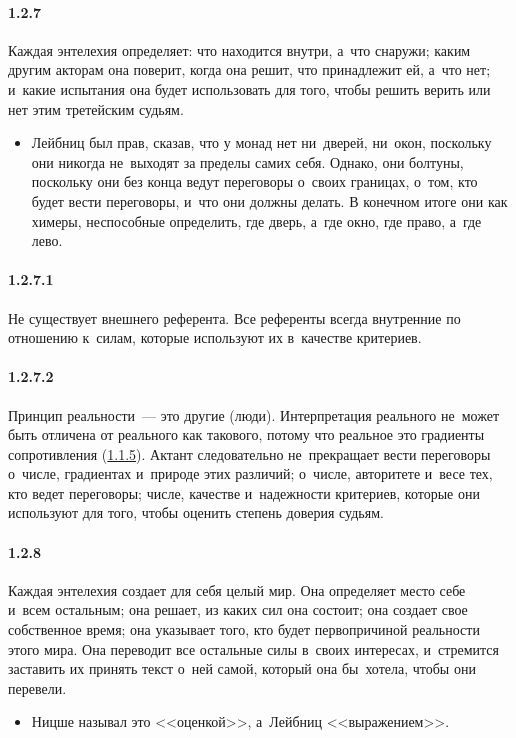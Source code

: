 \paragraph{1.2.7}\hypertarget{par:1.2.7}{} Каждая энтелехия определяет: что находится внутри, а~что снаружи; каким другим акторам она поверит, когда она решит, что принадлежит ей, а~что нет; и~какие испытания она будет использовать для того, чтобы решить верить или нет этим третейским судьям. 
	\begin{itemize}
	\item Лейбниц был прав, сказав, что у монад нет ни~дверей, ни~окон, поскольку они никогда не~выходят за пределы самих себя. Однако, они болтуны, поскольку они без конца ведут переговоры о~своих границах, о~том, кто будет вести переговоры, и~что они должны делать. В конечном итоге они как химеры, неспособные определить, где дверь, а~где окно, где право, а~где лево.
	\end{itemize}

\paragraph{1.2.7.1}\hypertarget{par:1.2.7.1}{} Не существует внешнего референта. Все референты всегда внутренние по отношению к~силам, которые используют их в~качестве критериев.

\paragraph{1.2.7.2}\hypertarget{par:1.2.7.2}{} Принцип реальности~--- это другие (люди).
Интерпретация реального не~может быть отличена от реального как такового, потому что реальное это градиенты сопротивления (\hyperlink{par:1.1.5}{1.1.5}). Актант следовательно не~прекращает вести переговоры о~числе, градиентах и~природе этих различий; о~числе, авторитете и~весе тех, кто ведет переговоры; числе, качестве и~надежности критериев, которые они используют для того, чтобы оценить степень доверия судьям.

\paragraph{1.2.8}\hypertarget{par:1.2.8}{} Каждая энтелехия создает для себя целый мир. Она определяет место себе и~всем остальным; она решает, из каких сил она состоит; она создает свое собственное время; она указывает того, кто будет первопричиной реальности этого мира. Она переводит все остальные силы в~своих интересах, и~стремится заставить их принять текст о~ней самой, который она бы~хотела, чтобы они перевели.
	\begin{itemize}
	\item Ницше называл это <<оценкой>>, а~Лейбниц <<выражением>>.
	\end{itemize}

